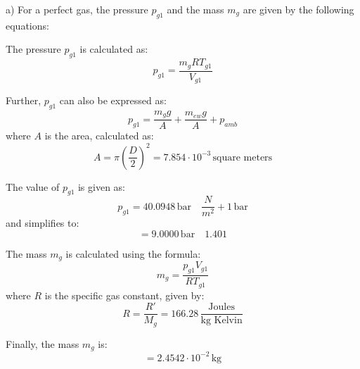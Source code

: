 a) For a perfect gas, the pressure \( p_{g1} \) and the mass \( m_g \) are given by the following equations:

The pressure \( p_{g1} \) is calculated as:
\[
p_{g1} = \frac{m_g R T_{g1}}{V_{g1}}
\]

Further, \( p_{g1} \) can also be expressed as:
\[
p_{g1} = \frac{m_g g}{A} + \frac{m_{ew} g}{A} + p_{amb}
\]
where \( A \) is the area, calculated as:
\[
A = \pi \left(\frac{D}{2}\right)^2 = 7.854 \cdot 10^{-3} \, \text{square meters}
\]

The value of \( p_{g1} \) is given as:
\[
p_{g1} = 40.0948 \, \text{bar} \quad \frac{N}{m^2} + 1 \, \text{bar}
\]
and simplifies to:
\[
= 9.0000 \, \text{bar} \quad 1.401
\]

The mass \( m_g \) is calculated using the formula:
\[
m_g = \frac{p_{g1} V_{g1}}{R T_{g1}}
\]
where \( R \) is the specific gas constant, given by:
\[
R = \frac{R'}{M_g} = 166.28 \, \frac{\text{Joules}}{\text{kg Kelvin}}
\]

Finally, the mass \( m_g \) is:
\[
= 2.4542 \cdot 10^{-2} \, \text{kg}
\]